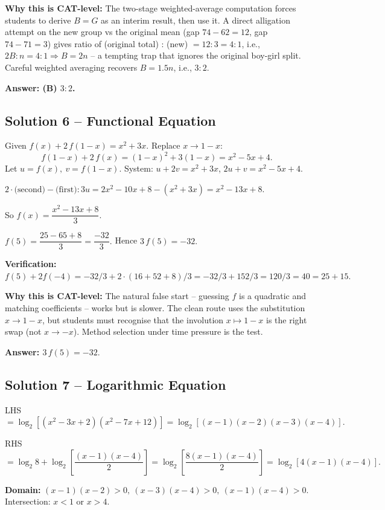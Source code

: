 \documentclass[11pt,a4paper]{article}
\begin{document}
\textbf{Why this is CAT-level:} The two-stage weighted-average computation forces students to derive $B=G$ as an interim result, then use it. A direct alligation attempt on the new group vs the original mean (gap $74-62=12$, gap $74-71=3$) gives ratio of (original total) : (new) $= 12:3 = 4:1$, i.e., $2B:n = 4:1 \Rightarrow B = 2n$ -- a tempting trap that ignores the original boy-girl split. Careful weighted averaging recovers $B = 1.5n$, i.e., $3:2$.

\textbf{Answer: (B) $3:2$.}

\medskip

\subsection*{Solution 6 -- Functional Equation}
Given $f(x)+2\,f(1-x)=x^{2}+3x.$ Replace $x \to 1-x$:
\[
f(1-x)+2\,f(x)=(1-x)^{2}+3(1-x)=x^{2}-5x+4.
\]
Let $u=f(x),\ v=f(1-x)$. System: $u+2v=x^{2}+3x$, $2u+v=x^{2}-5x+4.$

$2\cdot\text{(second)} - \text{(first)}: 3u = 2x^{2}-10x+8 - (x^{2}+3x) = x^{2}-13x+8.$

So $f(x) = \dfrac{x^{2}-13x+8}{3}.$

$f(5) = \dfrac{25-65+8}{3} = \dfrac{-32}{3}.$ Hence $3\,f(5) = -32.$

\textbf{Verification:} $f(5) + 2f(-4) = -32/3 + 2\cdot (16+52+8)/3 = -32/3 + 152/3 = 120/3 = 40 = 25 + 15.$ \checkmark

\textbf{Why this is CAT-level:} The natural false start -- guessing $f$ is a quadratic and matching coefficients -- works but is slower. The clean route uses the substitution $x\to 1-x$, but students must recognise that the involution $x \mapsto 1-x$ is the right swap (not $x \to -x$). Method selection under time pressure is the test.

\textbf{Answer: $3\,f(5) = -32.$}

\medskip

\subsection*{Solution 7 -- Logarithmic Equation}
LHS $=\log_{2}[(x^{2}-3x+2)(x^{2}-7x+12)]= \log_2[(x-1)(x-2)(x-3)(x-4)].$

RHS $=\log_2 8 + \log_2\!\left[\dfrac{(x-1)(x-4)}{2}\right] = \log_2\!\left[\dfrac{8(x-1)(x-4)}{2}\right] = \log_2[4(x-1)(x-4)].$

\textbf{Domain:}
$(x-1)(x-2)>0,\ (x-3)(x-4)>0,\ (x-1)(x-4)>0.$
Intersection: $x<1$ or $x>4.$
\end{document}
